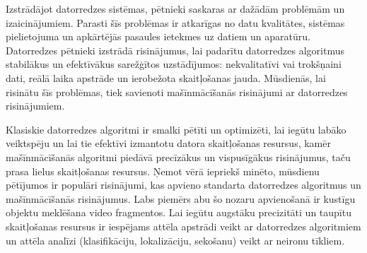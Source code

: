 Izstrādājot datorredzes sistēmas, pētnieki saskaras ar dažādām problēmām un izaicinājumiem. Parasti šīs problēmas ir atkarīgas no datu kvalitātes, sistēmas pielietojuma un apkārtējās pasaules ietekmes uz datiem un aparatūru. Datorredzes pētnieki izstrādā risinājumus, lai padarītu datorredzes algoritmus stabilākus un efektīvākus sarežģītos uzstādījumos: nekvalitatīvi vai trokšņaini dati, reālā laika apstrāde un ierobežota skaitļošanas jauda. Mūsdienās, lai risinātu šīs problēmas, tiek savienoti mašīnmācīšanās risinājumi ar datorredzes risinājumiem.

Klasiskie datorredzes algoritmi ir smalki pētīti un optimizēti, lai iegūtu labāko veiktspēju un lai tie efektīvi izmantotu datora skaitļošanas resursus, kamēr mašīnmācīšanās algoritmi piedāvā precīzākus un vispusīgākus risinājumus, taču prasa lielus skaitļošanas resursus. Ņemot vērā iepriekš minēto, mūsdienu pētījumos ir populāri risinājumi, kas apvieno standarta datorredzes algoritmus un mašīnmācīšanās risinājumus. Labs piemērs abu šo nozaru apvienošanā ir kustīgu objektu meklēšana video fragmentos. Lai iegūtu augstāku precizitāti un taupītu skaitļošanas resursus ir iespējams attēla apstrādi veikt ar datorredzes algoritmiem un attēla analīzi (klasifikāciju, lokalizāciju, sekošanu) veikt ar neironu tīkliem.



